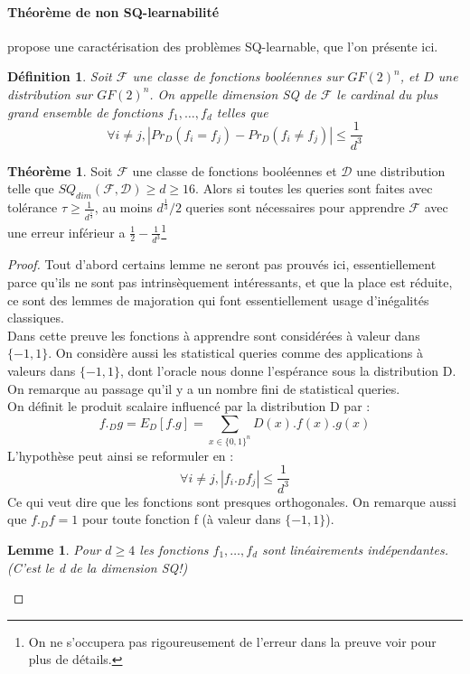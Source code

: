 \documentclass{article}		%
\newtheorem{defi}{Définition}
\theoremstyle{definition}
\newtheorem{theo}{Théorème}
\theoremstyle{plain}
\theoremstyle{plain}
\theoremstyle{plain}
\newtheorem{lemma}{Lemme}
\theoremstyle{plain}
\theoremstyle{plain}
\begin{document}
\paragraph{Théorème de non SQ-learnabilité}
\cite{Blum} propose une caractérisation des problèmes SQ-learnable, que
l'on présente ici.
\begin{defi}
Soit $\mathcal{F}$ une classe de fonctions booléennes sur $GF(2)^n$, et $D$ une
distribution sur $GF(2)^n$.
On appelle dimension SQ de $\mathcal{F}$ le cardinal
du plus grand ensemble de fonctions $f_1,\dots, f_d$ telles que 
$$\forall i \not= j, |Pr_D(f_i=f_j)-Pr_D(f_i \not= f_j)|\leq \frac{1}{d^3} $$
\end{defi}
\begin{framed}
\begin{theo}
Soit $\mathcal{F}$ une classe de fonctions booléennes et $\mathcal{D}$
une distribution telle que $SQ_{dim}(\mathcal{F}, \mathcal{D})\geq d \geq
16$. Alors si toutes les queries sont faites avec tolérance
$\tau\geq\frac{1}{d^{\frac{1}{3}}}$, au moins $d^{\frac{1}{3}}/2$ queries
sont nécessaires pour apprendre $\mathcal{F}$ avec une erreur inférieur a
$\frac{1}{2}-\frac{1}{d^3}$\footnote{On ne s'occupera pas rigoureusement de l'erreur
dans la preuve voir \cite{Blum} pour plus de détails.}
\end{theo}
\begin{proof}
Tout d'abord certains lemme ne seront pas prouvés ici, essentiellement
parce qu'ils ne sont pas intrinsèquement intéressants, et que la place
est réduite, ce sont des lemmes de majoration qui font essentiellement
usage d'inégalités classiques.\\ 
Dans cette preuve les fonctions à apprendre sont considérées à valeur dans
$\{-1,1\}$. On considère aussi les statistical queries comme des
applications à valeurs dans $\{-1,1\}$, dont l'oracle nous donne
l'espérance sous la distribution D. On remarque au passage qu'il y a un
nombre fini de statistical queries.
\\
On définit le produit scalaire influencé par la distribution D par :
$$ f._{D}g=E_D[f.g]=\sum_{x\in\{0,1\}^n} D(x).f(x).g(x)$$
L'hypothèse peut ainsi se reformuler en :
$$\forall i \not= j , |f_i._{D}f_{j}|\leq\frac{1}{d^3}$$
Ce qui veut dire que les fonctions sont presques orthogonales.
On remarque aussi que $ f._{D}f=1$ pour toute fonction f (à valeur dans
$\{-1,1\}$).
\begin{lemma}
Pour $d\geq4$ les fonctions $f_1,\dots,f_d$ sont linéairements
indépendantes. (C'est le d de la dimension SQ!)
\end{lemma}

\end{proof}
\end{framed}
\end{document}
